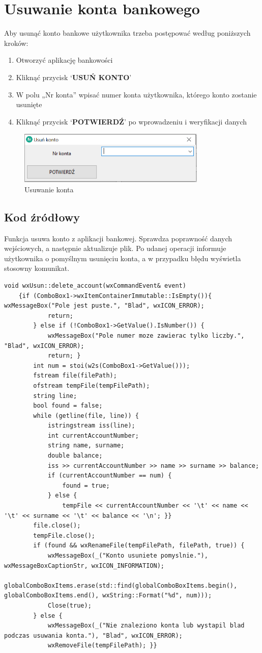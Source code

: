 \documentclass[a4paper,12pt]{article}
\begin{document}
	\section{Usuwanie konta bankowego}
	Aby usunąć konto bankowe użytkownika trzeba postępować według poniższych kroków:	
	\begin{enumerate}
	\item Otworzyć aplikację bankowości
	\item Kliknąć przycisk ‘\textbf{USUŃ KONTO}’
	\item W polu „Nr konta” wpisać numer konta użytkownika, którego konto zostanie usunięte
	\item Kliknąć przycisk ‘\textbf{POTWIERDŹ}’ po wprowadzeniu i weryfikacji danych
\end{enumerate}
\begin{figure}[h]
	\centering
	\includegraphics[width=0.8\textwidth]{usun.png}
	\caption{Usuwanie konta}
	\label{usun}
\end{figure}
\newpage
\subsection{Kod źródłowy}
Funkcja usuwa konto z aplikacji bankowej. Sprawdza poprawność danych wejściowych, a następnie aktualizuje plik. Po udanej operacji informuje użytkownika o pomyślnym usunięciu konta, a w przypadku błędu wyświetla stosowny komunikat.
\begin{lstlisting}
void wxUsun::delete_account(wxCommandEvent& event)
	{if (ComboBox1->wxItemContainerImmutable::IsEmpty()){ wxMessageBox("Pole jest puste.", "Blad", wxICON_ERROR);
			return;
		} else if (!ComboBox1->GetValue().IsNumber()) {
			wxMessageBox("Pole numer moze zawierac tylko liczby.", "Blad", wxICON_ERROR);
			return; }
		int num = stoi(w2s(ComboBox1->GetValue()));
		fstream file(filePath);
		ofstream tempFile(tempFilePath);
		string line;
		bool found = false;
		while (getline(file, line)) {
			istringstream iss(line);
			int currentAccountNumber;
			string name, surname;
			double balance;
			iss >> currentAccountNumber >> name >> surname >> balance;
			if (currentAccountNumber == num) {
				found = true;
			} else {
				tempFile << currentAccountNumber << '\t' << name << '\t' << surname << '\t' << balance << '\n';	}}
		file.close();
		tempFile.close();
		if (found && wxRenameFile(tempFilePath, filePath, true)) {
			wxMessageBox(_("Konto usuniete pomyslnie."), wxMessageBoxCaptionStr, wxICON_INFORMATION);
			globalComboBoxItems.erase(std::find(globalComboBoxItems.begin(), globalComboBoxItems.end(), wxString::Format("%d", num)));
			Close(true);
		} else {
			wxMessageBox(_("Nie znaleziono konta lub wystapil blad podczas usuwania konta."), "Blad", wxICON_ERROR);
			wxRemoveFile(tempFilePath);	}}
\end{lstlisting}
\end{document}
